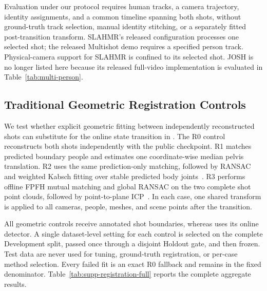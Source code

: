 \begin{table}[t]
  \parbox{0.98\textwidth}{\footnotesize
  Evaluation under our protocol requires human tracks, a camera trajectory,
  identity assignments, and a common timeline spanning both shots, without ground-truth track selection,
  manual identity stitching, or a separately fitted post-transition transform.
  SLAHMR's released configuration processes one selected shot; the released Multishot
  demo requires a specified person track. Physical-camera support for SLAHMR
  is confined to its selected shot. JOSH is no longer listed here because its
  released full-video implementation is evaluated in Table~\ref{tab:multi-person}.}
\end{table}

\FloatBarrier
\subsection{Traditional Geometric Registration Controls}
\label{app:registration-controls}

We test whether explicit geometric fitting between independently reconstructed
shots can substitute for the online state transition in \method{}. The R0
control reconstructs both shots independently with the public \humanthree{}
checkpoint. R1 matches predicted boundary people and estimates one
coordinate-wise median pelvis translation. R2 uses the same prediction-only
matching, followed by RANSAC and weighted Kabsch fitting over stable predicted
body joints~\citep{fischler1981ransac,kabsch1976solution}. R3 performs offline
FPFH mutual matching and global RANSAC on the two complete shot point clouds,
followed by point-to-plane ICP~\citep{rusu2009fpfh,besl1992registration}. In
each case, one shared transform is applied to all cameras, people, meshes, and
scene points after the transition.

All geometric controls receive annotated shot boundaries, whereas \method{}
uses its online detector. A single dataset-level setting for each control is
selected on the complete Development split, passed once through a disjoint
Holdout gate, and then frozen. Test data are never used for tuning, ground-truth
registration, or per-case method selection. Every failed fit is an exact R0
fallback and remains in the fixed denominator. Table~\ref{tab:supp-registration-full}
reports the complete aggregate results.

